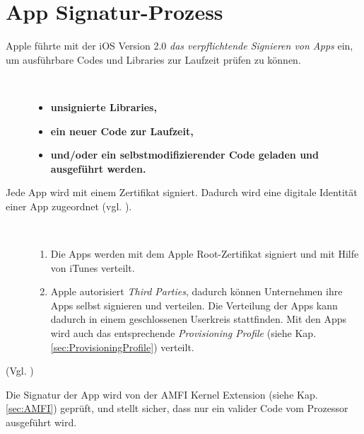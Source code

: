 \section{App Signatur-Prozess}
\label{sec:SigningProcess}

Apple führte mit der iOS Version 2.0 \textit{\glqq das verpflichtende Signieren von Apps\grqq{}} ein, um ausführbare Codes und Libraries zur Laufzeit prüfen zu können. 
\begin{description}
    \item[\parbox{\textwidth} {Das Signieren einer App verhindert, dass}]~\par
    \begin{itemize}
        \item \textbf{unsignierte Libraries,}
        \item \textbf{ein neuer Code zur Laufzeit,} 
        \item \textbf{und/oder ein selbstmodifizierender Code geladen und ausgeführt werden.}
    \end{itemize}
\end{description} 
Jede App wird mit einem Zertifikat signiert. Dadurch wird eine digitale Identität einer App zugeordnet (vgl. \cite{Cert[2], Cert[3]}).
\begin{description}
    \item[\parbox{\textwidth} {Eine App kann auf zwei Arten signiert werden}]~\par
   \begin{enumerate}
        \item Die Apps werden mit dem Apple Root-Zertifikat signiert und mit Hilfe von iTunes verteilt. 
        
        \item Apple autorisiert \textit{\glqq Third Parties\grqq}, dadurch können Unternehmen ihre Apps selbst signieren und verteilen. Die Verteilung der Apps kann dadurch in einem geschlossenen Userkreis stattfinden. Mit den Apps wird auch das entsprechende \textit{\glqq Provisioning Profile\grqq{}} (siehe Kap. \ref{sec:ProvisioningProfile}) verteilt.
    \end{enumerate} 
\end{description} 
(Vgl. \cite{Sign[1], Sign[2], Sign[3], Sign[4], Sign[5], ROP[1]}) \par 
Die Signatur der App wird von der AMFI Kernel Extension (siehe Kap. \ref{sec:AMFI}) geprüft, und stellt sicher, dass nur ein valider Code vom Prozessor ausgeführt wird.    
 
